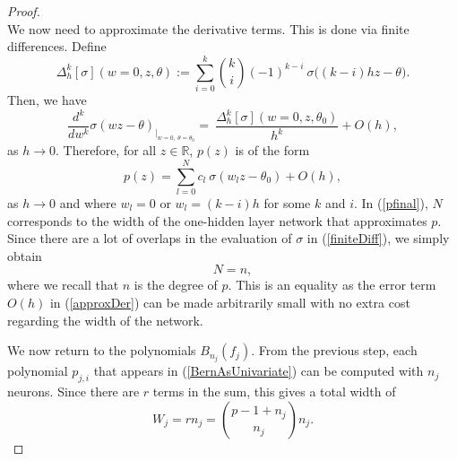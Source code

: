 \documentclass[anon,12pt]{colt2021} %
\begin{document}
\begin{proof}
\begin{equation}
\end{equation}
We now need to approximate the derivative terms. This is done via finite differences. Define
\begin{equation} \label{finiteDiff}
    \Delta_{h}^{k} [\sigma] (w=0, z, \theta) := \sum_{i=0}^{k} 
    \binom{k}{i}
    (-1)^{k-i} \ \sigma \big( (k-i)hz - \theta \big).
\end{equation}
Then, we have
\begin{equation} \label{approxDer}
    \frac{d^{k}}{dw^{k}} \sigma(wz - \theta)_{\big|_{ \scriptstyle w=0, \ \theta = \theta_{0}}} = \ \frac{\Delta_{h}^{k} [\sigma] (w=0, z, \theta_{0})}{h^{k}} + O(h),
\end{equation}
as $h \rightarrow 0$. Therefore, for all $z \in \mathbb{R}$, $p(z)$ is of the form
\begin{equation} \label{pfinal}
    p(z) = \sum_{l=0}^{N} c_{l} \ \sigma(w_{l}z - \theta_{0}) + O(h),
\end{equation}
as $h \rightarrow 0$ and where $w_{l} = 0$ or $w_{l} = (k-i)h$ for some $k$ and $i$. In (\ref{pfinal}), $N$ corresponds to the width of the one-hidden layer network that approximates $p$. Since there are a lot of overlaps in the evaluation of $\sigma$ in (\ref{finiteDiff}), we simply obtain
\begin{equation*}
    N = n,
\end{equation*}
where we recall that $n$ is the degree of $p$. This is an equality as the error term $O(h)$ in (\ref{approxDer}) can be made arbitrarily small with no extra cost regarding the width of the network.

We now return to the polynomials $B_{n_{j}}(f_{j})$. From the previous step, each polynomial $p_{j,i}$ that appears in (\ref{BernAsUnivariate}) can be computed with $n_{j}$ neurons. Since there are $r$ terms in the sum, this gives a total width of
\begin{equation*}
    W_{j} = r n_{j} = 
    \binom{p -1 +n_{j}}{n_{j} } 
    n_{j}.
\end{equation*}


\end{proof}
\end{document}
